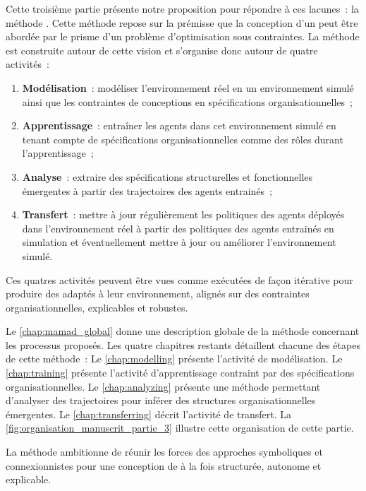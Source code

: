 \noindent
Cette troisième partie présente notre proposition pour répondre à ces lacunes~: la méthode . Cette méthode repose sur la prémisse que la conception d'un  peut être abordée par le prisme d'un problème d'optimisation sous contraintes. La méthode est construite autour de cette vision et s'organise donc autour de quatre activités~:

\begin{enumerate}
  \item \textbf{Modélisation}~: modéliser l'environnement réel en un environnement simulé ainsi que les contraintes de conceptions en spécifications organisationnelles~;
  \item \textbf{Apprentissage}~: entraîner les agents dans cet environnement simulé en tenant compte de spécifications organisationnelles comme des rôles durant l'apprentissage~;
  \item \textbf{Analyse}~: extraire des spécifications structurelles et fonctionnelles émergentes à partir des trajectoires des agents entrainés~;
  \item \textbf{Transfert}~: mettre à jour régulièrement les politiques des agents déployés dans l'environnement réel à partir des politiques des agents entrainés en simulation et éventuellement mettre à jour ou améliorer l'environnement simulé.
\end{enumerate}

\noindent
Ces quatres activités peuvent être vues comme exécutées de façon itérative pour produire des  adaptés à leur environnement, alignés sur des contraintes organisationnelles, explicables et robustes.

\medskip

\noindent
Le \autoref{chap:mamad_global} donne une description globale de la méthode concernant les processus proposés. Les quatre chapitres restants détaillent chacune des étapes de cette méthode~:
Le \autoref{chap:modelling} présente l'activité de modélisation.
Le \autoref{chap:training} présente l'activité d'apprentissage contraint par des spécifications organisationnelles.
Le \autoref{chap:analyzing} présente une méthode permettant d'analyser des trajectoires pour inférer des structures organisationnelles émergentes.
Le \autoref{chap:transferring} décrit l'activité de transfert.
La \autoref{fig:organisation_manuscrit_partie_3} illustre cette organisation de cette partie.

La méthode  ambitionne de réunir les forces des approches symboliques et connexionnistes pour une conception de  à la fois structurée, autonome et explicable.

